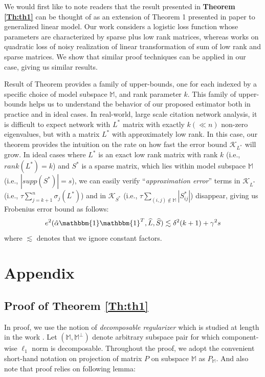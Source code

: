 \documentclass[AMS,STIX1COL]{WileyNJD-v2}
\begin{document}
We would first like to note readers that the result presented in \textbf{Theorem \ref{Th:th1}} can be thought of as an extension of Theorem 1 presented in paper \cite{agarwal2012noisy} to generalized linear model.
Our work considers a logistic loss function whose parameters are characterized by sparse plus low rank matrices, whereas \cite{agarwal2012noisy} works on quadratic loss of noisy realization of linear transformation of sum of low rank and sparse matrices.
We show that similar proof techniques can be applied in our case, giving us similar results.

Result of Theorem provides a family of upper-bounds, one for each indexed by a specific choice of model subspace $\mathbb{M}$, and rank parameter $k$. This family of upper-bounds helps us to understand the behavior of our proposed estimator both in practice and in ideal cases. In real-world, large scale citation network analysis, it is difficult to expect network with $L^*$ matrix with exactly $k(\ll n)$ non-zero eigenvalues, but with a matrix $L^*$ with approximately low rank.
In this case, our theorem provides the intuition on the rate on how fast the error bound $\mathcal{K}_{L^*}$ will grow.
In ideal cases where $L^*$ is an exact low rank matrix with rank $k$ (i.e., $rank(L^*)=k$) and $S^*$ is a sparse matrix, which lies within model subspace $\mathbb{M}$ (i.e., $|supp(S^*)|=s$), we can easily verify ``\emph{approximation error}'' terms in $\mathcal{K}_{L^*}$ (i.e., $\tau\sum_{j=k+1}^{n}\sigma_j(L^*)$) and in $\mathcal{K}_{S^*}$ (i.e., $\tau\sum_{(i,j)\notin \mathbb{M}}|S_{ij}^*|$) disappear, giving us Frobenius error bound as follows:
\[
    e^{2}(\hat{\alpha}\mathbbm{1}\mathbbm{1}^T,\widehat{L},\widehat{S}) \lesssim \delta^2(k+1)+\gamma^2s
\]
where $\lesssim$ denotes that we ignore constant factors.

\section{Appendix}
\subsection{Proof of Theorem \ref{Th:th1}}

In proof, we use the notion of \emph{decomposable regularizer} which is studied at length in the work \cite{negahban2012unified}. Let $(\mathbb{M},\mathbb{M}^{\perp})$ denote arbitrary subspace pair for which component-wise $\ell_{1}$ norm is decomposable. Throughout the proof, we adopt the convenient short-hand notation on projection of matrix $P$ on subspace $\mathbb{M}$ as $P_{\mathbb{M}}$. And also note that proof relies on following lemma:
\end{document}
